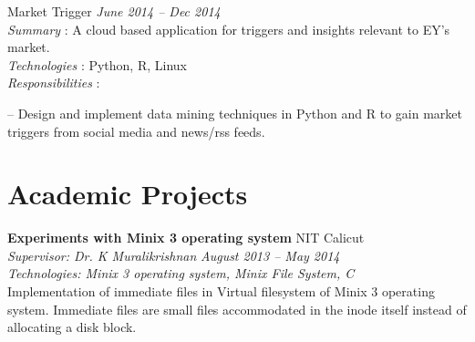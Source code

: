 \documentclass[margin,line]{resume}
\begin{document}
\begin{resume}
    Market Trigger				 \hfill  \textit{June 2014 -- Dec 2014} \\ 
\textit{Summary} : A cloud based application for triggers and insights relevant to EY's market.	 \\
      \textit{Technologies} : Python, R, Linux\\
      \textit{Responsibilities} : 
     	 	\begin{list2}
\item[--] Design and implement data mining techniques in Python and R to gain market triggers from
social media and news/rss feeds.
	\end{list2}

	 
 \vspace{3mm}


    \section{\mysidestyle Academic Projects}

   
	
	
    \textbf{Experiments with Minix 3 operating system } 				\hfill NIT Calicut \\
      \textit{Supervisor: Dr. K Muralikrishnan } 			\hfill \textit{August 2013 -- May 2014}\\
      \textit{Technologies: Minix 3 operating system, Minix File System, C }\\
    Implementation of immediate files in Virtual filesystem of Minix 3 operating system. Immediate files are small files accommodated in the inode itself instead of allocating a disk block. 


\end{resume}
\end{document}
